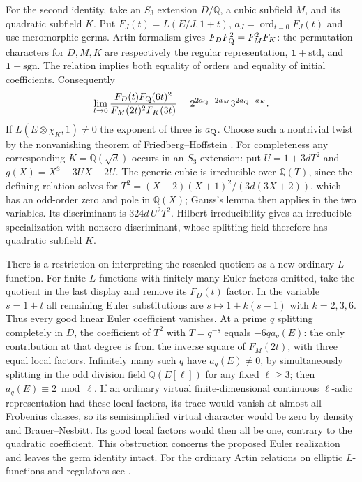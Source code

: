 \documentclass[11pt]{article}
\begin{document}
For the second identity, take an $S_3$ extension $D/\mathbb Q$, a
cubic subfield $M$, and its quadratic subfield $K$. Put
$F_J(t)=L(E/J,1+t)$, $a_J=\operatorname{ord}_{t=0}F_J(t)$ and use
meromorphic germs. Artin formalism gives
$F_D F_{\rm Q}^2=F_M^2F_K$: the permutation characters for
$D,M,K$ are respectively the regular representation,
$\mathbf1+\mathrm{std}$, and $\mathbf1+\mathrm{sgn}$. The relation
implies both equality of orders and equality of initial coefficients.
Consequently
\[
 \lim_{t\to0}\frac{F_D(t)F_{\rm Q}(6t)^2}
 {F_M(2t)^2 F_K(3t)}
 = 2^{2a_{\rm Q}-2a_M}3^{2a_{\rm Q}-a_K}.
\]
If $L(E\otimes\chi_K,1)\ne0$ the exponent of three is $a_{\rm Q}$.
Choose such a nontrivial twist by the nonvanishing theorem of
Friedberg--Hoffstein \cite{FH}. For completeness any corresponding
$K=\mathbb Q(\sqrt d)$ occurs in an $S_3$ extension: put
$U=1+3dT^2$ and $g(X)=X^3-3UX-2U$. The generic cubic is irreducible
over $\mathbb Q(T)$, since the defining relation solves for
$T^2=(X-2)(X+1)^2/(3d(3X+2))$, which has an odd-order zero and pole
in $\mathbb Q(X)$; Gauss's lemma then applies in the two variables.
Its discriminant is $324d\,U^2T^2$. Hilbert irreducibility gives an
irreducible specialization with nonzero discriminant, whose splitting
field therefore has quadratic subfield $K$.

There is a restriction on interpreting the rescaled quotient as a
new ordinary $L$-function. For finite $L$-functions with finitely many
Euler factors omitted, take the quotient in the last display and remove
its $F_D(t)$ factor. In the variable $s=1+t$ all remaining Euler
substitutions are $s\mapsto1+k(s-1)$ with $k=2,3,6$. Thus every
good linear Euler coefficient vanishes. At a prime $q$ splitting
completely in $D$, the coefficient of $T^2$ with $T=q^{-s}$ equals
$-6q a_q(E)$: the only contribution at that degree is from the inverse
square of $F_M(2t)$, with three equal local factors. Infinitely many
such $q$ have $a_q(E)\ne0$, by simultaneously splitting in the odd
division field $\mathbb Q(E[\ell])$ for any fixed $\ell\ge3$; then
$a_q(E)\equiv2\bmod\ell$. If an ordinary virtual finite-dimensional
continuous $\ell$-adic representation had these local factors, its
trace would vanish at almost all Frobenius classes, so its
semisimplified virtual character would be zero by density and
Brauer--Nesbitt. Its good local factors would then all be one, contrary
to the quadratic coefficient. This obstruction concerns the proposed
Euler realization and leaves the germ identity intact. For the
ordinary Artin relations on elliptic $L$-functions and regulators see
\cite{DD}.
\end{document}
